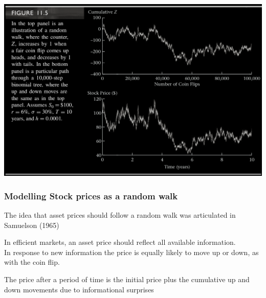 \begin{frame}[fragile,t]
\begin{center}
	\includegraphics[scale=0.25]{figs/Figure-11-5.png}
\end{center}
\end{frame}
\begin{frame}[fragile]
	\frametitle{Modelling Stock prices as a random walk}

	\begin{center}

		The idea that asset prices should follow a random walk was articulated in Samuelson (1965)
		\vfill

		In efficient markets, an asset price should reflect all available information. \\

		In response to new information the price is equally likely to move up or down, as with the coin
		flip.

		\vfill

		The price after a period of time is the initial price plus the cumulative up and down movements
		due to informational surprises

	\end{center}
\end{frame}
